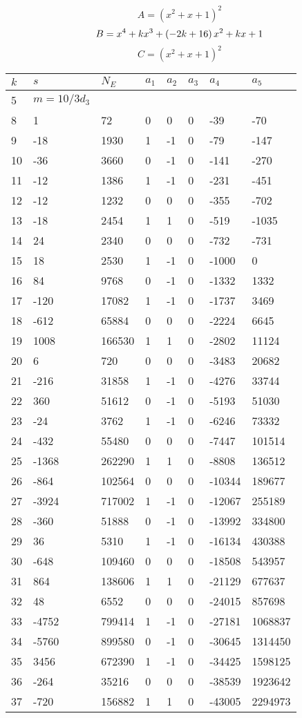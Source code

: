 \documentclass{amsart}
\begin{document}
$$A=(x^2
 + x
 + 1)^{2}$$
$$B=x^4
 + k\*x^3
 + \left(-2\*k
 + 16\right) \*x^2
 + k\*x
 + 1$$
$$C=(x^2
 + x
 + 1)^{2}$$
\begin{longtable}{|l|l|l|lllll|}
\hline
$k$ & $s$ & $N_E$ & $a_1$ & $a_2$ & $a_3$ & $a_4$ & $a_5$\\
\hline
5&$m=10/3d_{3}$&&\multicolumn{5}{c|}{}\\
8&1&72&0&0&0&-39&-70\\
9&-18&1930&1&-1&0&-79&-147\\
10&-36&3660&0&-1&0&-141&-270\\
11&-12&1386&1&-1&0&-231&-451\\
12&-12&1232&0&0&0&-355&-702\\
13&-18&2454&1&1&0&-519&-1035\\
14&24&2340&0&0&0&-732&-731\\
15&18&2530&1&-1&0&-1000&0\\
16&84&9768&0&-1&0&-1332&1332\\
17&-120&17082&1&-1&0&-1737&3469\\
18&-612&65884&0&0&0&-2224&6645\\
19&1008&166530&1&1&0&-2802&11124\\
20&6&720&0&0&0&-3483&20682\\
21&-216&31858&1&-1&0&-4276&33744\\
22&360&51612&0&-1&0&-5193&51030\\
23&-24&3762&1&-1&0&-6246&73332\\
24&-432&55480&0&0&0&-7447&101514\\
25&-1368&262290&1&1&0&-8808&136512\\
26&-864&102564&0&0&0&-10344&189677\\
27&-3924&717002&1&-1&0&-12067&255189\\
28&-360&51888&0&-1&0&-13992&334800\\
29&36&5310&1&-1&0&-16134&430388\\
30&-648&109460&0&0&0&-18508&543957\\
31&864&138606&1&1&0&-21129&677637\\
32&48&6552&0&0&0&-24015&857698\\
33&-4752&799414&1&-1&0&-27181&1068837\\
34&-5760&899580&0&-1&0&-30645&1314450\\
35&3456&672390&1&-1&0&-34425&1598125\\
36&-264&35216&0&0&0&-38539&1923642\\
37&-720&156882&1&1&0&-43005&2294973\\

\end{longtable}
\end{document}
